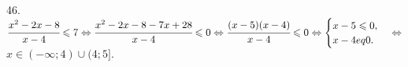46. $\cfrac{x^2-2x-8}{x-4}\leqslant 7\Leftrightarrow \cfrac{x^2-2x-8-7x+28}{x-4}\leqslant0 \Leftrightarrow \cfrac{(x-5)(x-4)}{x-4}\leqslant0
\Leftrightarrow \begin{cases}x-5\leqslant 0,\\ x-4
eq0.\end{cases}\Leftrightarrow$\\$ x\in (-\infty;4)\cup(4;5].$\\
